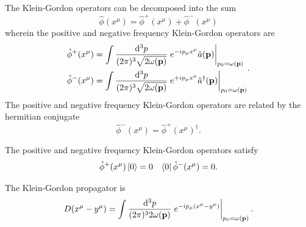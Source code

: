 \begin{definition}
	The Klein-Gordon operators can be decomposed into the sum
	\begin{equation}
		\hat\phi(x^\mu)
		=
		\hat\phi^+(x^\mu)
		+
		\hat\phi^-(x^\mu)
	\end{equation}
	wherein the positive and negative frequency Klein-Gordon operators are
	\begin{equation}
		\begin{split}
			\hat\phi^+(x^\mu)
			&=
			\int\frac{\dd[3]{p}}{(2\pi)^3\sqrt{2\omega(\vb{p})}}
			\eval{
				e^{-ip_\mu x^\mu}
				\hat{a}(\vb{p})
			}_{p_0=\omega(\vb{p})}
			\\
			\hat\phi^-(x^\mu)
			&=
			\int\frac{\dd[3]{p}}{(2\pi)^3\sqrt{2\omega(\vb{p})}}
			\eval{
				e^{+ip_\mu x^\mu}
				\hat{a}^\dagger(\vb{p})
			}_{p_0=\omega(\vb{p})}
		\end{split}
		\label{eq:qkg_positive_negative_frequency}
		.
	\end{equation}
	The positive and negative frequency Klein-Gordon operators are related by the hermitian conjugate
	\begin{equation}
		\hat\phi^-(x^\mu)
		=
		\hat\phi^+(x^\mu)^\dagger
		.
	\end{equation}
\end{definition}
\begin{corollary}\label{thm:vacuum_state_pn}
	The positive and negative frequency Klein-Gordon operators satisfy
	\begin{align}
		\hat\phi^+(x^\mu)
		\ket{0}
		=
		0
		&&
		\bra{0}
		\hat\phi^-(x^\mu)
		=
		0
		\label{eq:vacuum_state_pn}
		.
	\end{align}
\end{corollary}
\begin{definition}
	The Klein-Gordon propagator is
	\begin{equation}
		D(x^\mu-y^\mu)
		=
		\int\frac{\dd[3]{p}}{(2\pi)^32\omega(\vb{p})}
		\eval{
			e^{-ip_\mu (x^\mu-y^\mu)}
		}_{p_0=\omega(\vb{p})}
		.
	\end{equation}
\end{definition}

